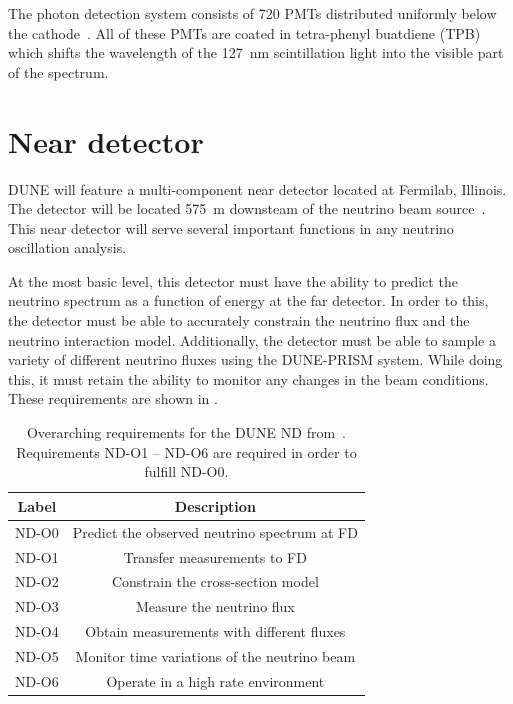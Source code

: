 The photon detection system consists of 720 PMTs distributed uniformly below the cathode~\cite{idrVol3}.
All of these PMTs are coated in tetra-phenyl buatdiene (TPB) which shifts the wavelength of the \SI{127}{\nano\metre} scintillation light into the visible part of the spectrum.

\section{Near detector}
\label{sec:dune:nd}

DUNE will feature a multi-component near detector located at Fermilab, Illinois.
The detector will be located \SI{575}{\metre} downsteam of the neutrino beam source~\cite{tdrVol1}.
This near detector will serve several important functions in any neutrino oscillation analysis.

At the most basic level, this detector must have the ability to predict the neutrino spectrum as a function of energy at the far detector.
In order to this, the detector must be able to accurately constrain the neutrino flux and the neutrino interaction model.
Additionally, the detector must be able to sample a variety of different neutrino fluxes using the DUNE-PRISM system.
While doing this, it must retain the ability to monitor any changes in the beam conditions.
These requirements are shown in .

\begin{table}
  \caption[Overarching requirements for the DUNE ND]{Overarching requirements for the DUNE ND from~\cite{ndCdr}. Requirements ND-O1 -- ND-O6 are required in order to fulfill ND-O0.}
  \label{tab:ndReqs}
  \centering
  \begin{tabular}{c c}
    \hline
    \hline
    Label & Description \\
    \hline
    ND-O0 & Predict the observed neutrino spectrum at FD \\
    \hline
    ND-O1 & Transfer measurements to FD \\
    ND-O2 & Constrain the cross-section model \\
    ND-O3 & Measure the neutrino flux \\
    ND-O4 & Obtain measurements with different fluxes \\
    ND-O5 & Monitor time variations of the neutrino beam \\
    ND-O6 & Operate in a high rate environment \\
    \hline
  \end{tabular}
\end{table}

